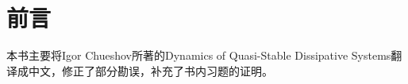 \ch\chapter{前\quad 言}
	本书主要将Igor Chueshov所著的Dynamics of Quasi-Stable Dissipative Systems翻译成中文，修正了部分勘误，补充了书内习题的证明。